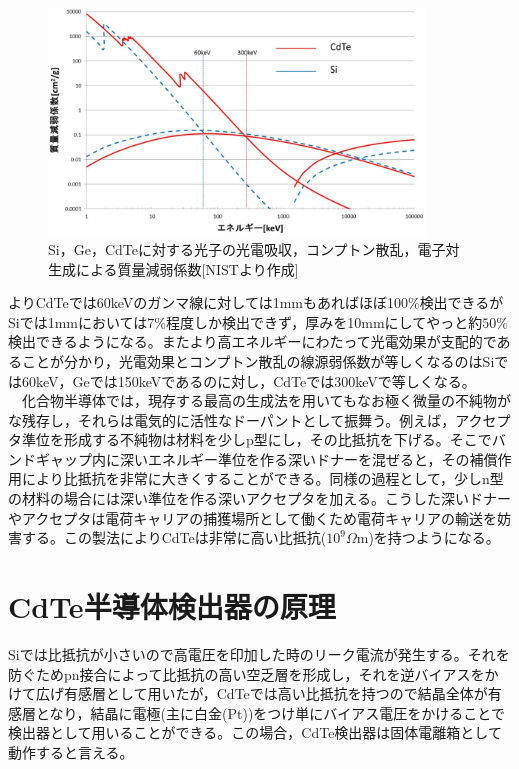 \begin{figure}[H]
 \begin{center}
 \includegraphics[width=10cm]{image/other/CdTe_Si.eps}
 \end{center}
 \caption{Si，Ge，CdTeに対する光子の光電吸収，コンプトン散乱，電子対生成による質量減弱係数[NIST\cite{nist}より作成]}
 \label{fig:liner_comp}
\end{figure}

よりCdTeでは60keVのガンマ線に対しては1mmもあればほぼ100$\%$検出できるがSiでは1mmにおいては$7\%$程度しか検出できず，厚みを10mmにしてやっと約$50\%$検出できるようになる。またより高エネルギーにわたって光電効果が支配的であることが分かり，光電効果とコンプトン散乱の線源弱係数が等しくなるのはSiでは60keV，Geでは150keVであるのに対し，CdTeでは300keVで等しくなる。\\
\ \ 化合物半導体では，現存する最高の生成法を用いてもなお極く微量の不純物がな残存し，それらは電気的に活性なドーパントとして振舞う。例えば，アクセプタ準位を形成する不純物は材料を少しp型にし，その比抵抗を下げる。そこでバンドギャップ内に深いエネルギー準位を作る深いドナーを混ぜると，その補償作用により比抵抗を非常に大きくすることができる。同様の過程として，少しn型の材料の場合には深い準位を作る深いアクセプタを加える。こうした深いドナーやアクセプタは電荷キャリアの捕獲場所として働くため電荷キャリアの輸送を妨害する。この製法によりCdTeは非常に高い比抵抗($10^9\Omega$m)を持つようになる。

\section{CdTe半導体検出器の原理}

Siでは比抵抗が小さいので高電圧を印加した時のリーク電流が発生する。それを防ぐためpn接合によって比抵抗の高い空乏層を形成し，それを逆バイアスをかけて広げ有感層として用いたが，CdTeでは高い比抵抗を持つので結晶全体が有感層となり，結晶に電極(主に白金(Pt))をつけ単にバイアス電圧をかけることで検出器として用いることができる。この場合，CdTe検出器は固体電離箱として動作すると言える。

